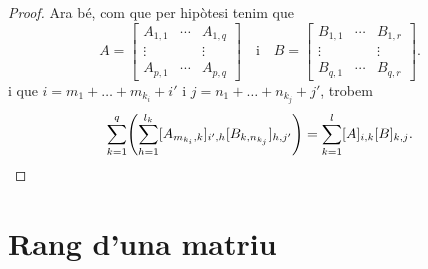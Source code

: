 \documentclass[../Apunts.tex]{subfiles}
\begin{document}
\begin{proposition}
\begin{proof}
			Ara bé, com que per hipòtesi tenim que
			\[A=\left[\begin{matrix}
			A_{1,1} & \cdots & A_{1,q} \\
			\vdots & & \vdots \\
			A_{p,1} & \cdots & A_{p,q}
			\end{matrix}\right]\quad\text{i}\quad B=\left[\begin{matrix}
			B_{1,1} & \cdots & B_{1,r} \\
			\vdots & & \vdots \\
			B_{q,1} & \cdots & B_{q,r}
			\end{matrix}\right].\]
			i que \(i=m_{1}+\dots+m_{k_{i}}+i'\) i \(j=n_{1}+\dots+n_{k_{j}}+j'\), trobem
			\[\sum_{k=1}^{q}\left(\sum_{h=1}^{l_{k}}[A_{m_{k_{i}},k}]_{i',h}[B_{k,n_{k_{j}}}]_{h,j'}\right)=\sum_{k=1}^{l}[A]_{i,k}[B]_{k,j}.\qedhere\]
		\end{proof}
	\end{proposition}
	\section{Rang d'una matriu}
\end{document}
